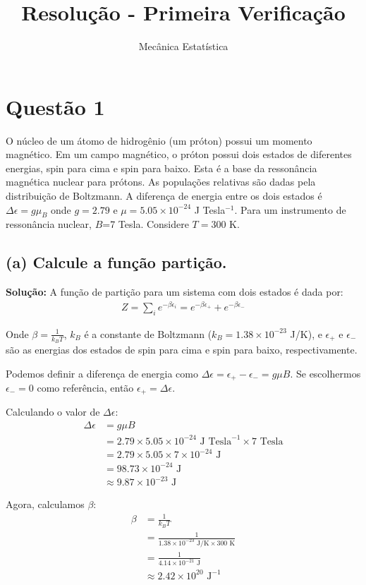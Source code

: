 \documentclass[fleqn,a4paper]{article}
\title{Resolução - Primeira Verificação}
\author{Mecânica Estatística}
\date{}
\begin{document}
\maketitle

\section*{Questão 1}
O núcleo de um átomo de hidrogênio (um próton) possui um momento magnético.
Em um campo magnético, o próton possui dois estados de diferentes energias, spin para cima e spin para baixo. Esta é a base da ressonância magnética nuclear para prótons. As populações relativas são dadas pela distribuição de Boltzmann. A diferença de energia entre os dois estados é $\Delta\epsilon =g\mu_B$ onde $g=2.79$ e $\mu=5.05\times 10^{-24}$ J Tesla$^{-1}$. Para um instrumento de ressonância nuclear, $B$=7 Tesla. Considere $T=300$ K.

\subsection*{(a) Calcule a função partição.}

\textbf{Solução:}
A função de partição para um sistema com dois estados é dada por:
\begin{align}
Z = \sum_i e^{-\beta \epsilon_i} = e^{-\beta \epsilon_+} + e^{-\beta \epsilon_-}
\end{align}

Onde $\beta = \frac{1}{k_B T}$, $k_B$ é a constante de Boltzmann ($k_B = 1.38 \times 10^{-23}$ J/K), e $\epsilon_+$ e $\epsilon_-$ são as energias dos estados de spin para cima e spin para baixo, respectivamente.

Podemos definir a diferença de energia como $\Delta\epsilon = \epsilon_+ - \epsilon_- = g\mu B$. Se escolhermos $\epsilon_- = 0$ como referência, então $\epsilon_+ = \Delta\epsilon$.

Calculando o valor de $\Delta\epsilon$:
\begin{align}
\Delta\epsilon &= g\mu B \\
&= 2.79 \times 5.05 \times 10^{-24} \text{ J Tesla}^{-1} \times 7 \text{ Tesla} \\
&= 2.79 \times 5.05 \times 7 \times 10^{-24} \text{ J} \\
&= 98.73 \times 10^{-24} \text{ J} \\
&\approx 9.87 \times 10^{-23} \text{ J}
\end{align}

Agora, calculamos $\beta$:
\begin{align}
\beta &= \frac{1}{k_B T} \\
&= \frac{1}{1.38 \times 10^{-23} \text{ J/K} \times 300 \text{ K}} \\
&= \frac{1}{4.14 \times 10^{-21} \text{ J}} \\
&\approx 2.42 \times 10^{20} \text{ J}^{-1}
\end{align}
\end{document}
